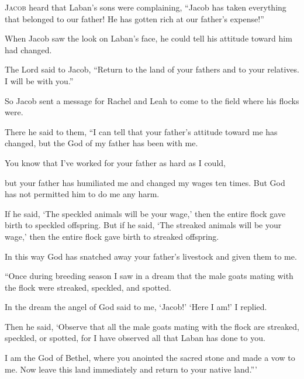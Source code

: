 \begin{scripture}
 \allowchapbreak\hypertarget{ch-genesis-31}{}\lettrine[lines=5]{\color{pentateuch}J}{\textsc{acob}} heard that Laban's sons were complaining, ``Jacob has taken everything that belonged to our father! He has gotten rich at our father's expense!''\everypar{}
 When Jacob saw the look on Laban's face, he could tell his attitude toward him had changed.
\\\indent{} The Lord said to Jacob, ``Return to the land of your fathers and to your relatives. I will be with you.''
 So Jacob sent a message for Rachel and Leah to come to the field where his flocks were.
 There he said to them, ``I can tell that your father's attitude toward me has changed, but the God of my father has been with me.
 You know that I've worked for your father as hard as I could,
 but your father has humiliated me and changed my wages ten times. But God has not permitted him to do me any harm.
 If he said, `The speckled animals will be your wage,' then the entire flock gave birth to speckled offspring. But if he said, `The streaked animals will be your wage,' then the entire flock gave birth to streaked offspring.
 In this way God has snatched away your father's livestock and given them to me.
\everypar{}

 ``Once during breeding season I saw in a dream that the male goats mating with the flock were streaked, speckled, and spotted.
 In the dream the angel of God said to me, `Jacob!' `Here I am!' I replied.
 Then he said, `Observe that all the male goats mating with the flock are streaked, speckled, or spotted, for I have observed all that Laban has done to you.
 I am the God of Bethel, where you anointed the sacred stone and made a vow to me. Now leave this land immediately and return to your native land.'''
\everypar{}


\end{scripture}
